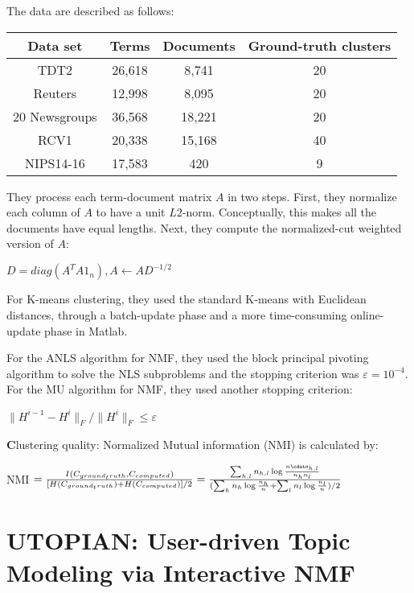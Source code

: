\documentclass[11pt, oneside]{article}   	%
\begin{document}
The data are described as follows:
\begin{center}
 \begin{tabular}{||c c c c||} 
 \hline
 Data set & Terms & Documents & Ground-truth clusters \\ [0.5ex] 
 \hline\hline
 TDT2 & 26,618 & 8,741 & 20 \\ 
 \hline
 Reuters & 12,998 & 8,095 & 20 \\
 \hline
 20 Newsgroups & 36,568 & 18,221 & 20 \\
 \hline
 RCV1 & 20,338 & 15,168 & 40 \\
 \hline
 NIPS14-16 & 17,583 & 420 & 9 \\ [1ex] 
 \hline
\end{tabular}
\end{center}

They  process each term-document matrix $A$ in two steps. First, they normalize each column of $A$ to have a unit $L2$-norm. Conceptually, this makes all the documents have equal lengths. Next, they compute the normalized-cut weighted version of $A$:
\begin{center}
$D = diag(A^{T}A1_n), A\leftarrow AD^{-1/2}$
\end{center}

For K-means clustering, they used the standard K-means with Euclidean distances, through a batch-update phase and a more time-consuming online-update phase in Matlab.

For the ANLS algorithm for NMF, they used the block principal pivoting algorithm to solve the NLS subproblems and the stopping criterion was $\varepsilon = 10^{-4}$. For the MU algorithm for NMF, they used another stopping criterion:
\begin{center}
$\|H^{i-1}-H^{i}\|_{F}/\|H^{i}\|_{F}\leq\varepsilon$
\end{center}

\textbf Clustering quality: Normalized Mutual information (NMI) is calculated by:
\begin{center}
NMI $= \frac{I(C_{ground_truth},C_{computed})}{[H(C_{ground_truth})+H(C_{computed})]/2}=\frac{\sum_{h,l} n_{h,l}\log \frac{n\cdotn_{h,l}}{n_{h}n_{l}}}{(\sum_{h} n_{h}\log \frac{n_{h}}{n}+\sum_{l} n_{l}\log \frac{n_{l}}{n})/2}$
\end{center}

\section{UTOPIAN: User-driven Topic Modeling via Interactive NMF}
\end{document}
